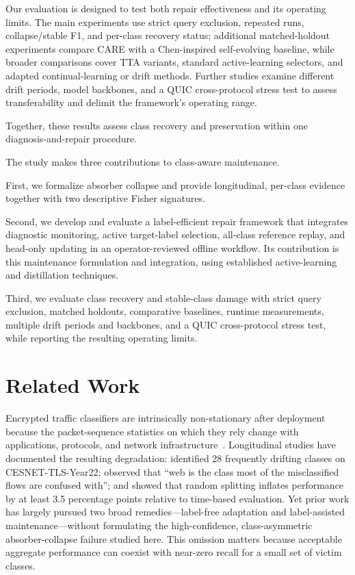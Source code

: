 \documentclass[preprint,12pt,authoryear]{elsarticle}
\let\cite\citep
\newcommand{\ours}{CARE}  %
\begin{document}
Our evaluation is designed to test both repair effectiveness and its operating limits.
The main experiments use strict query exclusion, repeated runs, collapse/stable F1, and per-class recovery status; additional matched-holdout experiments compare \ours{} with a Chen-inspired self-evolving baseline, while broader comparisons cover TTA variants, standard active-learning selectors, and adapted continual-learning or drift methods.
Further studies examine different drift periods, model backbones, and a QUIC cross-protocol stress test to assess transferability and delimit the framework's operating range.

Together, these results assess class recovery and preservation within one diagnosis-and-repair procedure.

The study makes three contributions to class-aware maintenance.

First, we formalize absorber collapse and provide longitudinal, per-class evidence together with two descriptive Fisher signatures.

Second, we develop and evaluate a label-efficient repair framework that integrates diagnostic monitoring, active target-label selection, all-class reference replay, and head-only updating in an operator-reviewed offline workflow. Its contribution is this maintenance formulation and integration, using established active-learning and distillation techniques.

Third, we evaluate class recovery and stable-class damage with strict query exclusion, matched holdouts, comparative baselines, runtime measurements, multiple drift periods and backbones, and a QUIC cross-protocol stress test, while reporting the resulting operating limits.


\section{Related Work}
\label{sec:related}

Encrypted traffic classifiers are intrinsically non-stationary after deployment because the packet-sequence statistics on which they rely change with applications, protocols, and network infrastructure~\cite{rezaei2019deep,soukup2025drift,malekghaini2023drift}. Longitudinal studies have documented the resulting degradation: \citet{soukup2025drift} identified 28 frequently drifting classes on CESNET-TLS-Year22; \citet{malekghaini2023drift} observed that ``web is the class most of the misclassified flows are confused with''; and \citet{jerabek2025eval} showed that random splitting inflates performance by at least 3.5 percentage points relative to time-based evaluation. Yet prior work has largely pursued two broad remedies---label-free adaptation and label-assisted maintenance---without formulating the high-confidence, class-asymmetric absorber-collapse failure studied here. This omission matters because acceptable aggregate performance can coexist with near-zero recall for a small set of victim classes.
\end{document}
